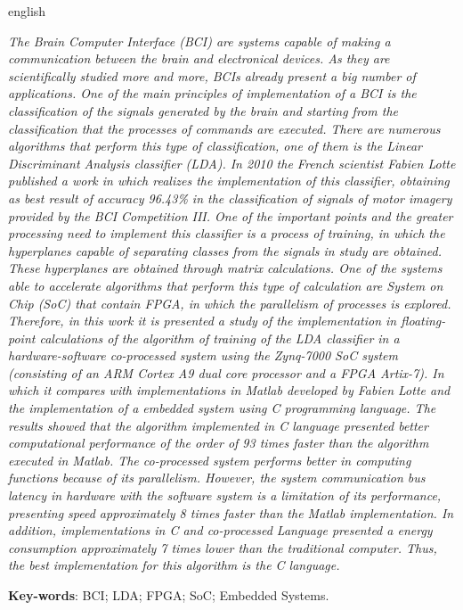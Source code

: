 \begin{resumo}[Abstract]
 \begin{otherlanguage*}{english}

   \vspace{\onelineskip}
 	\textit{The Brain Computer Interface (BCI) are systems capable of making a communication between the brain and electronical devices. As they are scientifically studied more and more, BCIs already present a big number of applications. One of the main principles of implementation of a BCI is the classification of the signals generated by the brain and starting from the classification that the processes of commands are executed. There are numerous algorithms that perform this type of classification, one of them is the Linear Discriminant Analysis classifier (LDA). In 2010 the French scientist Fabien Lotte published a work in which realizes the implementation of this classifier, obtaining as best result of accuracy 96.43\% in the classification of signals of motor imagery provided by the BCI Competition III. One of the important points and the greater processing need to implement this classifier is a process of training, in which the hyperplanes capable of separating classes from the signals in study are obtained. These hyperplanes are obtained through matrix calculations. One of the systems able to accelerate algorithms that perform this type of calculation are System on Chip (SoC) that contain FPGA, in which the parallelism of processes is explored. Therefore, in this work it is presented a study of the implementation in floating-point calculations of the algorithm of training of the LDA classifier in a hardware-software co-processed system using the Zynq-7000 SoC system (consisting of an ARM Cortex A9 dual core processor and a FPGA Artix-7).  In which it compares with implementations in Matlab developed by Fabien Lotte and the implementation of a embedded system using C programming language. The results showed that the algorithm implemented in C language presented better computational performance of the order of 93 times faster than the algorithm executed in Matlab. The co-processed system performs better in computing functions because of its parallelism. However, the system communication bus latency in hardware with the software system is a limitation of its performance, presenting speed approximately 8 times faster than the Matlab implementation. In addition, implementations in C and co-processed Language presented a energy consumption approximately 7 times lower than the traditional computer. Thus, the best implementation for this algorithm is the C language.}
 	
   \noindent 
   \textbf{Key-words}: BCI; LDA; FPGA; SoC; Embedded Systems.
 \end{otherlanguage*}
\end{resumo}
